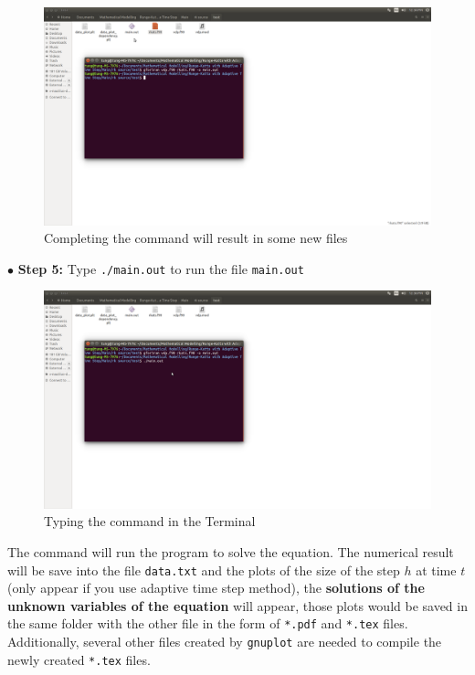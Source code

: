 \documentclass{article}
\begin{document}
	\begin{figure}[H]
		\centering	\includegraphics[width=15cm]{fig6}
		\caption{Completing the command will result in some new files}
	\end{figure}
	\noindent$\bullet$ \textbf{Step 5:} Type \texttt{./main.out} to run the file \texttt{main.out}
	\begin{figure}[H]
		\centering	\includegraphics[width=15cm]{fig7}
		\caption{Typing the command in the Terminal}
	\end{figure}
	\noindent The command will run the program to solve the equation. The numerical result will be save into the file \texttt{data.txt} and the plots of the size of the step $h$ at time $t$ (only appear if you use adaptive time step method), the \textbf{solutions of the unknown variables of the equation} will appear, those plots would be saved in the same folder with the other file in the form of \texttt{*.pdf} and \texttt{*.tex} files. Additionally, several other files created by \texttt{gnuplot} are needed to compile the newly created \texttt{*.tex} files. 
\end{document}
